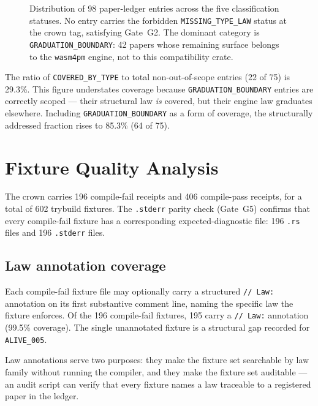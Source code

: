 \begin{figure}[ht]
\begin{tikzpicture}
\end{tikzpicture}
\caption{Distribution of 98 paper-ledger entries across the five classification
  statuses. No entry carries the forbidden \texttt{MISSING\_TYPE\_LAW} status
  at the crown tag, satisfying Gate~G2. The dominant category is
  \texttt{GRADUATION\_BOUNDARY}: 42 papers whose remaining surface belongs to
  the \texttt{wasm4pm} engine, not to this compatibility crate.}
\label{fig:paper-pie}
\end{figure}

The ratio of \texttt{COVERED\_BY\_TYPE} to total non-out-of-scope entries
(22 of 75) is 29.3\%. This figure understates coverage because
\texttt{GRADUATION\_BOUNDARY} entries are correctly scoped --- their structural
law \emph{is} covered, but their engine law graduates elsewhere. Including
\texttt{GRADUATION\_BOUNDARY} as a form of coverage, the structurally addressed
fraction rises to 85.3\% (64 of 75).

\section{Fixture Quality Analysis}
\label{sec:crown-fixtures}

The crown carries 196 compile-fail receipts and 406 compile-pass receipts, for
a total of 602 trybuild fixtures. The \texttt{.stderr} parity check (Gate~G5)
confirms that every compile-fail fixture has a corresponding expected-diagnostic
file: 196 \texttt{.rs} files and 196 \texttt{.stderr} files.

\subsection{Law annotation coverage}
\label{ssec:crown-law-annotations}

Each compile-fail fixture file may optionally carry a structured
\texttt{// Law:} annotation on its first substantive comment line, naming the
specific law the fixture enforces. Of the 196 compile-fail fixtures, 195 carry
a \texttt{// Law:} annotation (99.5\% coverage). The single unannotated fixture
is a structural gap recorded for \texttt{ALIVE\_005}.

Law annotations serve two purposes: they make the fixture set searchable by law
family without running the compiler, and they make the fixture set auditable ---
an audit script can verify that every fixture names a law traceable to a
registered paper in the ledger.

